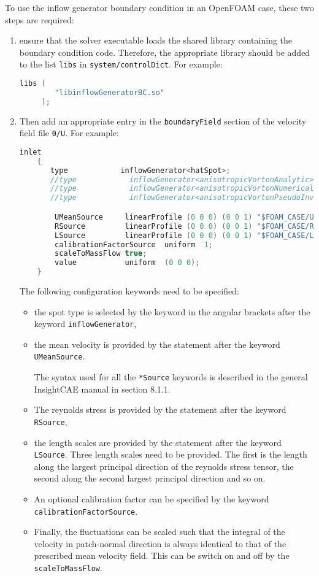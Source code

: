 \documentclass{sd_report}
\begin{document}
To use the inflow generator boundary condition in an OpenFOAM case, these two steps are required:
\begin{enumerate}
\item ensure that the solver executable loads the shared library containing the boundary condition code. Therefore, the appropriate library should be added to the list \texttt{libs} in \texttt{system/controlDict}. For example:

\begin{lstlisting}[language=c++]
libs (  
        "libinflowGeneratorBC.so"
     );
\end{lstlisting}

\item Then add an appropriate entry in the \texttt{boundaryField} section of the velocity field file \texttt{0/U}. For example:

\begin{lstlisting}[language=c++]
    inlet
    {
       type            inflowGenerator<hatSpot>;
       //type            inflowGenerator<anisotropicVortonAnalytic>;
       //type            inflowGenerator<anisotropicVortonNumerical>;
       //type            inflowGenerator<anisotropicVortonPseudoInverse>;

        UMeanSource     linearProfile (0 0 0) (0 0 1) "$FOAM_CASE/Umean.dat";
        RSource         linearProfile (0 0 0) (0 0 1) "$FOAM_CASE/R_ij.dat";
        LSource         linearProfile (0 0 0) (0 0 1) "$FOAM_CASE/L_ii.dat";
        calibrationFactorSource  uniform  1;
        scaleToMassFlow true;
        value           uniform  (0 0 0);
    }
\end{lstlisting}

The following configuration keywords need to be specified:
\begin{itemize}
\item the spot type is selected by the keyword in the angular brackets after the keyword \texttt{inflowGenerator},
\item the mean velocity is provided by the statement after the keyword \texttt{UMeanSource}.

The syntax used for all the \texttt{*Source} keywords is described in the general InsightCAE manual in section 8.1.1.
\item The reynolds stress is provided by the statement after the keyword \texttt{RSource},
\item the length scales are provided by the statement after the keyword \texttt{LSource}. Three length scales need to be provided. The first is the length along the largest principal direction of the reynolds stress tensor, the second along the second largest principal direction and so on.
\item An optional calibration factor can be specified by the keyword \texttt{calibrationFactorSource}.
\item Finally, the fluctuations can be scaled such that the integral of the velocity in patch-normal direction is always identical to that of the prescribed mean velocity field. This can be switch on and off by the \texttt{scaleToMassFlow}.
\end{itemize}
\end{enumerate}
\end{document}
